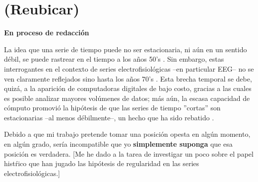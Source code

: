 \chapter{(Reubicar)}

\textbf{En proceso de redacci\'on}

La idea que una serie de tiempo puede no ser estacionaria, ni a\'un en un sentido d\'ebil, 
se puede rastrear en el tiempo a los a\~nos 50’s \cite{Page52,Silverman57}. 
Sin embargo, estas interrogantes en el contexto de series electrofisiol\'ogicas --en particular 
EEG-- no se ven claramente reflejados sino hasta los años 70’s 
\cite{Kawabata73,McEwen75,Cohen77,Sugimoto78}.
Esta brecha temporal se debe, quiz\'a, a la aparici\'on de computadoras digitales de bajo costo, 
gracias a las cuales es posible analizar mayores volúmenes de datos; m\'as a\'un, la escasa 
capacidad de c\'omputo promovi\'o la hip\'otesis de que las series de tiempo 
''cortas'' son estacionarias --al menos d\'ebilmente--, un hecho que ha sido 
rebatido \cite{Melard89,Adak98,Klonowski09}.



%

Debido a que mi trabajo pretende tomar una posici\'on opesta en alg\'un momento, en alg\'un grado,
ser\'ia incompatible que yo \textbf{simplemente suponga} que esa posici\'on es verdadera.
[Me he dado a la tarea de investigar un poco sobre el papel hist\'rico que han jugado las
hip\'otesis de regularidad en las series electrofisiol\'ogicas.]

